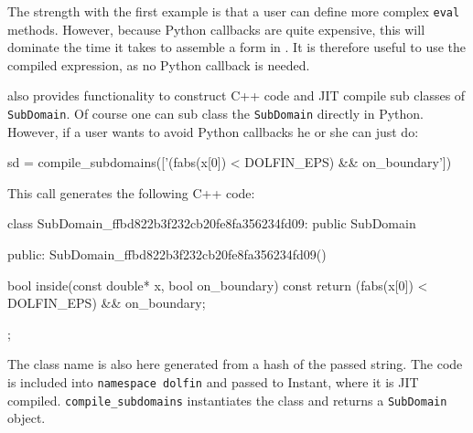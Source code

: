 The strength with the first example is that a user can define more complex \texttt{eval} methods. However, because Python callbacks are quite expensive, this will dominate the time it takes to assemble a form in \pydolfin. It is therefore useful to use the compiled expression, as no Python callback is needed.\par

\pydolfin also provides functionality to construct C++ code and JIT compile sub classes of \texttt{SubDomain}. Of course one can sub class the \texttt{SubDomain} directly in Python. However, if a user wants to avoid Python callbacks he or she can just do:
\begin{python}
sd = compile_subdomains(['(fabs(x[0]) < DOLFIN_EPS) && on_boundary'])
\end{python}
This call generates the following C++ code:
\begin{c++}
class SubDomain_ffbd822b3f232cb20fe8fa356234fd09: public SubDomain
{
public:
  SubDomain_ffbd822b3f232cb20fe8fa356234fd09(){}

  bool inside(const double* x, bool on_boundary) const{
      return (fabs(x[0]) < DOLFIN_EPS) && on_boundary;
  }
};
\end{c++}
The class name is also here generated from a hash of the passed string. The code is included into \texttt{namespace dolfin} and passed to Instant, where it is JIT compiled. \texttt{compile}\texttt{\_subdomains} instantiates the class and returns a \texttt{SubDomain} object.\par

%
%
%

